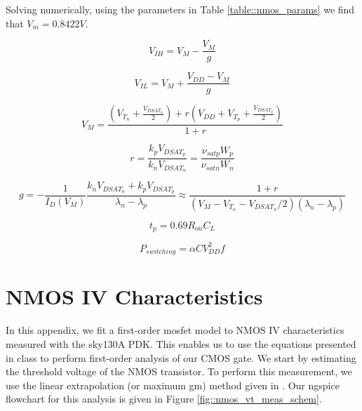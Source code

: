 \documentclass[fleqn]{article}
\begin{document}
	Solving numerically, using the parameters in Table \ref{table::nmos_params} we find that $V_m = 0.8422 V$.
	
	\begin{equation}
		V_{IH} = V_{M} - \frac{V_M}{g}
	\end{equation}
	
	\begin{equation}
		V_{IL} = V_{M} + \frac{V_{DD} - V_M}{g}
	\end{equation}
	
	\begin{equation}
		V_{M} = \frac{\left(V_{T_n} + \frac{V_{DSAT_n}}{2}\right) + r\left(V_{DD} + V_{T_p} + \frac{V_{DSAT_p}}{2}\right)}{1 + r}
	\end{equation}
	
	\begin{equation}
		r = \frac{k_pV_{DSAT_p}}{k_nV_{DSAT_n}} = \frac{{\nu}_{satp}W_p}{{\nu}_{satn}W_n}
	\end{equation}
	
	\begin{equation}
		g = -\frac{1}{I_D(V_M)}\frac{k_nV_{DSAT_n} + k_pV_{DSAT_p}}{\lambda_n - \lambda_p} \approx \frac{1 + r}{(V_M - V_{T_n} - V_{DSAT_n}/2)(\lambda_n - \lambda_p)}
	\end{equation}
	
	\begin{equation}
		t_p = 0.69R_{on}C_L
	\end{equation}
	
	\begin{equation}
		P_{switching} = {\alpha}CV_{DD}^2f
	\end{equation}
	
	
	
	\pagebreak
	\appendix
	\section{NMOS IV Characteristics}
	
	In this appendix, we fit a first-order mosfet model to NMOS IV characteristics measured with the sky130A PDK. This enables us to use the equations presented in class to perform first-order analysis of our CMOS gate. We start by estimating the threshold voltage of the NMOS transistor. To perform this measurement, we use the linear extrapolation (or maximum gm) method given in \cite{cmos_vlsi_design}. Our ngspice flowchart for this analysis is given in Figure \ref{fig::nmos_vt_meas_schem}.
	
\end{document}
